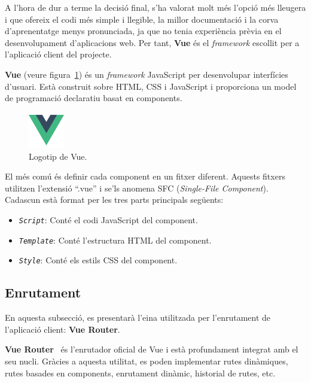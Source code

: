 \documentclass[a4paper,12pt]{ThesisStyle}
\begin{document}
A l'hora de dur a terme la decisió final, s'ha valorat molt més l'opció més lleugera i que ofereix el codi més simple i llegible, la millor documentació i la corva d'aprenentatge menys pronunciada, ja que no tenia experiència prèvia en el desenvolupament d'aplicacions web. Per tant, \textbf{Vue} és el \textit{framework} escollit per a l'aplicació client del projecte.

\textbf{Vue} (veure figura~\ref{img:logo_vue}) és un \textit{framework} JavaScript per desenvolupar interfícies d'usuari. Està construit sobre HTML, CSS i JavaScript i proporciona un model de programació declaratiu basat en components.

\begin{figure}[H]
  \centering
  \includegraphics[width=0.14\textwidth]{assets/logos/Vue.png}
  \caption{\label{img:logo_vue}Logotip de Vue.}
\end{figure}

El més comú és definir cada component en un fitxer diferent. Aquests fitxers utilitzen l'extensió ``.vue'' i se'ls anomena SFC (\textit{Single-File Component}). Cadascun està format per les tres parts principals següents:
\begin{itemize}
  \item \texttt{\textit{Script}}: Conté el codi JavaScript del component.
  \item \texttt{\textit{Template}}: Conté l'estructura HTML del component.
  \item \texttt{\textit{Style}}: Conté els estils CSS del component.
\end{itemize}

\subsection{Enrutament}
\label{subsec:decisions_client_enrutament}

En aquesta subsecció, es presentarà l'eina utilitzada per l'enrutament de l'aplicació client: \textbf{Vue Router}.

\textbf{Vue Router}~\cite{VueRouter} és l'enrutador oficial de Vue i està profundament integrat amb el seu nucli. Gràcies a aquesta utilitat, es poden implementar rutes dinàmiques, rutes basades en components, enrutament dinàmic, historial de rutes, etc.
\end{document}
